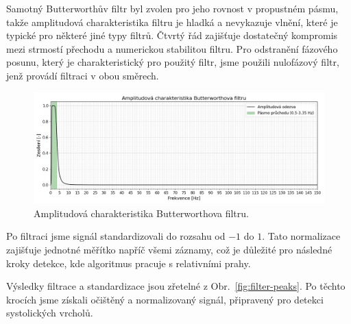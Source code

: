 Samotný Butterworthův filtr byl zvolen pro jeho rovnost v propustném pásmu, takže amplitudová charakteristika filtru je hladká a nevykazuje vlnění, které je typické pro některé jiné typy filtrů.
Čtvrtý řád zajišťuje dostatečný kompromis mezi strmostí přechodu a numerickou stabilitou filtru.
Pro odstranění fázového posunu, který je charakteristický pro použitý filtr, jsme použili nulofázový filtr, jenž provádí filtraci v obou směrech.

\begin{figure}[h]
	\centering
	\includegraphics[width=1\textwidth]{./obrazky/My_AFC.png}
	\vspace{-5mm}
	\caption[Vlastní amplitudová charakteristika Butterworthova filtru]{Amplitudová charakteristika Butterworthova filtru.}
	\vspace{-5mm}
	\label{fig:my_AFC}
\end{figure}

Po filtraci jsme signál standardizovali do rozsahu od \(-1\) do \(1\).
Tato normalizace zajišťuje jednotné měřítko napříč všemi záznamy, což je důležité pro následné kroky detekce, kde algoritmus pracuje s relativními prahy.

Výsledky filtrace a standardizace jsou zřetelné z Obr.~\ref{fig:filter-peaks}.
Po těchto krocích jsme získali očištěný a normalizovaný signál, připravený pro detekci systolických vrcholů.

